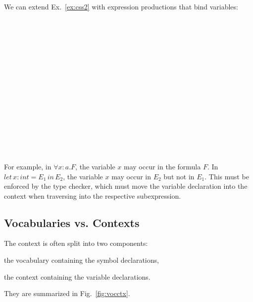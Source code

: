 \begin{example}\label{ex:css3}
We can extend Ex.~\ref{ex:css2} with expression productions that bind variables:
\begin{commgrammar}
\\
\\
\\
\\
\\
\\
\\
\\
\\
\\
\\
\\
\\
\\
\end{commgrammar}

For example, in $\forall x:a.F$, the variable $x$ may occur in the formula $F$.
In $let\,x:int=E_1\,in\,E_2$, the variable $x$ may occur in $E_2$ but not in $E_1$.
This must be enforced by the type checker, which must move the variable declaration into the context when traversing into the respective subexpression.
\end{example}


\subsection{Vocabularies vs. Contexts}

The context is often split into two components:
\begin{compactitem}
\item the vocabulary containing the symbol declarations,
\item the context containing the variable declarations.
\end{compactitem}
They are summarized in Fig.~\ref{fig:vocctx}.

